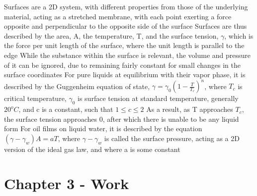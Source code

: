 \documentclass[11 pt, twoside]{article}
\newenvironment{outline*}
{
	\begin{outline}[enumerate]
	}
	{\end{outline}
}
\begin{document}
\begin{outline*}
\1 Surfaces are a 2D system, with different properties from those of the underlying material, acting as a stretched membrane, with each point exerting a force opposite and perpendicular to the opposite side of the surface
\2 Surfaces are thus described by the area, A, the temperature, T, and the surface tension, $\gamma$, which is the force per unit length of the surface, where the unit length is parallel to the edge
\2 While the substance within the surface is relevant, the volume and pressure of it can be ignored, due to remaining fairly constant for small changes in the surface coordinates
\2 For pure liquids at equilibrium with their vapor phase, it is described by the Guggenheim equation of state, $\gamma = \gamma_0(1 - \frac{T}{T_c})^n$, where $T_c$ is critical temperature, $\gamma_0$ is surface tension at standard temperature, generally $20^o C$, and c is a constant, such that $1 \leq c \leq 2$
\3 As a result, as T approaches $T_c$, the surface tension approaches 0, after which there is unable to be any liquid form
\2 For oil films on liquid water, it is described by the equation $(\gamma - \gamma_w)A = aT$, where $\gamma - \gamma_w$ is called the surface pressure, acting as a 2D version of the ideal gas law, and where a is some constant
\end{outline*}
\section{Chapter 3 - Work}
\end{document}
